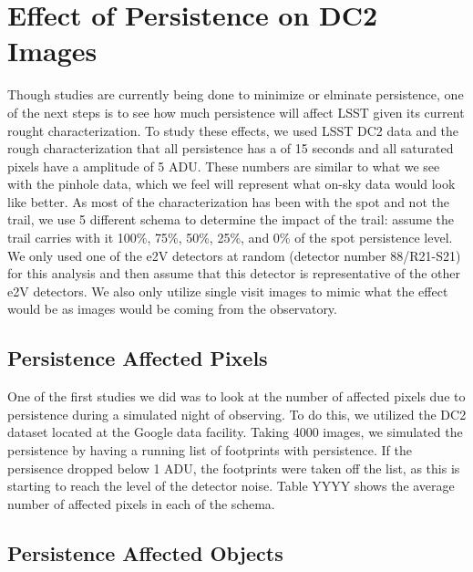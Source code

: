 \documentclass[DM,authoryear,toc]{lsstdoc}
\begin{document}
\section{Effect of Persistence on DC2 Images}

Though studies are currently being done to minimize or elminate persistence, one of the next steps is to see how much persistence will affect LSST given its current rought characterization.
To study these effects, we used LSST DC2 data and the rough characterization that all persistence has a \textit{\tau} of 15 seconds and all saturated pixels have a amplitude of 5 ADU.
These numbers are similar to what we see with the pinhole data, which we feel will represent what on-sky data would look like better.
As most of the characterization has been with the spot and not the trail, we use 5 different schema to determine the impact of the trail: assume the trail carries with it 100\%, 75\%, 50\%, 25\%, and 0\% of the spot persistence level.
We only used one of the e2V detectors at random (detector number 88/R21-S21) for this analysis and then assume that this detector is representative of the other e2V detectors.
We also only utilize single visit images to mimic what the effect would be as images would be coming from the observatory.

\subsection{Persistence Affected Pixels}

One of the first studies we did was to look at the number of affected pixels due to persistence during a simulated night of observing.
To do this, we utilized the DC2 dataset located at the Google data facility.
Taking 4000 images, we simulated the persistence by having a running list of footprints with persistence.
If the persisence dropped below 1 ADU, the footprints were taken off the list, as this is starting to reach the level of the detector noise.
Table YYYY shows the average number of affected pixels in each of the schema.

  



\subsection{Persistence Affected Objects}
\end{document}
